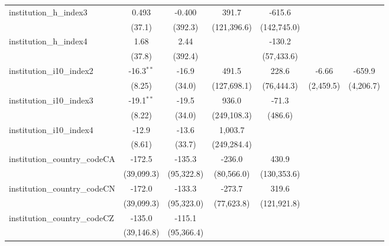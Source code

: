 \begin{tabular}{lcccccc}
   institution\_h\_index3                & 0.493        & -0.400        & 391.7       & -615.6      &               &   \\   
                                         & (37.1)       & (392.3)       & (121,396.6) & (142,745.0) &               &   \\   
   institution\_h\_index4                & 1.68         & 2.44          &             & -130.2      &               &   \\   
                                         & (37.8)       & (392.4)       &             & (57,433.6)  &               &   \\   
   institution\_i10\_index2              & -16.3$^{**}$ & -16.9         & 491.5       & 228.6       & -6.66         & -659.9\\   
                                         & (8.25)       & (34.0)        & (127,698.1) & (76,444.3)  & (2,459.5)     & (4,206.7)\\   
   institution\_i10\_index3              & -19.1$^{**}$ & -19.5         & 936.0       & -71.3       &               &   \\   
                                         & (8.22)       & (34.0)        & (249,108.3) & (486.6)     &               &   \\   
   institution\_i10\_index4              & -12.9        & -13.6         & 1,003.7     &             &               &   \\   
                                         & (8.61)       & (33.7)        & (249,284.4) &             &               &   \\   
   institution\_country\_codeCA          & -172.5       & -135.3        & -236.0      & 430.9       &               &   \\   
                                         & (39,099.3)   & (95,322.8)    & (80,566.0)  & (130,353.6) &               &   \\   
   institution\_country\_codeCN          & -172.0       & -133.3        & -273.7      & 319.6       &               &   \\   
                                         & (39,099.3)   & (95,323.0)    & (77,623.8)  & (121,921.8) &               &   \\   
   institution\_country\_codeCZ          & -135.0       & -115.1        &             &             &               &   \\   
                                         & (39,146.8)   & (95,366.4)    &             &             &               &   \\   

\end{tabular}
